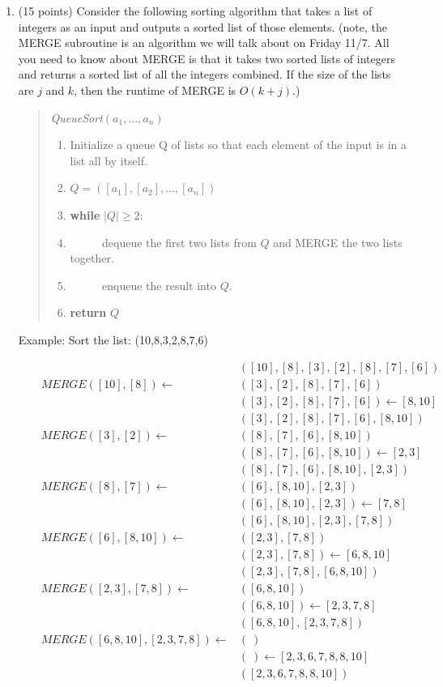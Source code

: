 \documentclass[10pt,letterpaper,unboxed,cm]{article}
\theoremstyle{definition}
\begin{document}
\begin{enumerate}
\begin{enumerate}
\end{enumerate}

\item (15 points)
Consider the following sorting algorithm that takes a list of integers as an input and outputs a sorted list of those elements. (note, the MERGE subroutine is an algorithm we will talk about on Friday 11/7. All you need to know about MERGE is that it takes two sorted lists of integers and returns a sorted list of all the integers combined. If the size of the lists are $j$ and $k$, then the runtime of MERGE is $O(k+j)$.)

\begin{quote}
\emph{QueueSort}$(a_1,\dots,a_n)$
\begin{enumerate}[1.]
\item Initialize a queue Q of lists so that each element of the input is in a list all by itself.
\item $Q = ([a_1],[a_2],\dots,[a_n])$
\item {\bf while} $|Q|\geq 2$:
\item ~~~~~ dequeue the first two lists from $Q$ and MERGE the two lists together.
\item ~~~~~ enqueue the result into $Q$.
\item {\bf return} $Q$
\end{enumerate}
\end{quote}
\newpage

Example: Sort the list: (10,8,3,2,8,7,6)

\begin{align*}
&&&([10],[8],[3],[2],[8],[7],[6])&\\
&&MERGE([10],[8])\leftarrow&([3],[2],[8],[7],[6])&\\
&&&([3],[2],[8],[7],[6])\leftarrow [8,10]\\
&&&([3],[2],[8],[7],[6],[8,10])&\\
&&MERGE([3],[2])\leftarrow&([8],[7],[6],[8,10])&\\
&&&([8],[7],[6],[8,10])\leftarrow [2,3]\\
&&&([8],[7],[6],[8,10],[2,3])&\\
&&MERGE([8],[7])\leftarrow&([6],[8,10],[2,3])&\\
&&&([6],[8,10],[2,3])\leftarrow [7,8]\\
&&&([6],[8,10],[2,3],[7,8])&\\
&&MERGE([6],[8,10])\leftarrow&([2,3],[7,8])&\\
&&&([2,3],[7,8])\leftarrow [6,8,10]\\
&&&([2,3],[7,8],[6,8,10])&\\
&&MERGE([2,3],[7,8])\leftarrow&([6,8,10])&\\
&&&([6,8,10])\leftarrow [2,3,7,8]\\
&&&([6,8,10],[2,3,7,8])&\\
&&MERGE([6,8,10],[2,3,7,8])\leftarrow&(~)&\\
&&&(~)\leftarrow [2,3,6,7,8,8,10]\\
&&&([2,3,6,7,8,8,10])&\\
\end{align*}


\end{enumerate}
\end{document}
